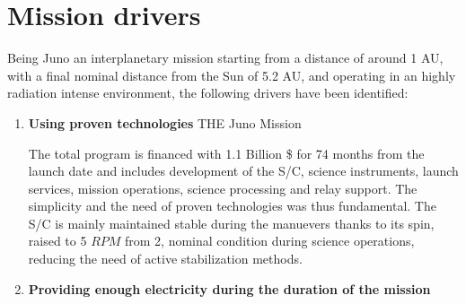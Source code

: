 \section{Mission drivers}
\label{sec:drivers}

Being Juno an interplanetary mission starting from a distance of around 1 AU, with a final nominal distance from the Sun of 5.2 AU, and operating in an highly radiation intense environment, the following drivers have been identified: 

\begin{enumerate}
    \item \textbf{Using proven technologies} THE Juno Mission

    The total program is financed with 1.1 Billion \$ for 74 months from the launch date and includes development of the S/C, science instruments, launch services, mission operations, science processing and relay support. The simplicity and the need of proven technologies was thus fundamental. The S/C is mainly maintained stable during the manuevers thanks to its spin, raised to 5 $RPM$ from 2, nominal condition during science operations, reducing the need of active stabilization methods.

    \item \textbf{Providing enough electricity during the duration of the mission} 
    \label{sec: solar drivers}
    

\end{enumerate}
